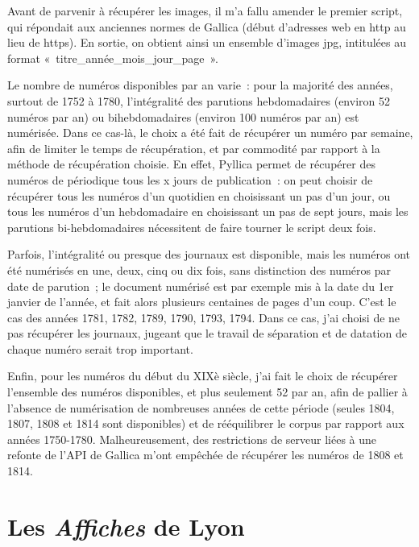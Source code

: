 \bigskip

Avant de parvenir à récupérer les images, il m’a fallu amender le premier script, qui répondait aux anciennes normes de Gallica (début d’adresses web en http au lieu de https). En sortie, on obtient ainsi un ensemble d’images jpg, intitulées au format « titre\_année\_mois\_jour\_page ».

Le nombre de numéros disponibles par an varie : pour la majorité des années, surtout de 1752 à 1780, l’intégralité des parutions hebdomadaires (environ 52 numéros par an) ou bihebdomadaires (environ 100 numéros par an) est numérisée. Dans ce cas-là, le choix a été fait de récupérer un numéro par semaine, afin de limiter le temps de récupération, et par commodité par rapport à la méthode de récupération choisie. En effet, Pyllica permet de récupérer des numéros de périodique tous les x jours de publication : on peut choisir de récupérer tous les numéros d’un quotidien en choisissant un pas d’un jour, ou tous les numéros d’un hebdomadaire en choisissant un pas de sept jours, mais les parutions bi-hebdomadaires nécessitent de faire tourner le script deux fois. 

Parfois, l’intégralité ou presque des journaux est disponible, mais les numéros ont été numérisés en une, deux, cinq ou dix fois, sans distinction des numéros par date de parution ; le document numérisé est par exemple mis à la date du 1er janvier de l’année, et fait alors plusieurs centaines de pages d’un coup. C’est le cas des années 1781, 1782, 1789, 1790, 1793, 1794. Dans ce cas, j’ai choisi de ne pas récupérer les journaux, jugeant que le travail de séparation et de datation de chaque numéro serait trop important.

Enfin, pour les numéros du début du XIXè siècle, j’ai fait le choix de récupérer l’ensemble des numéros disponibles, et plus seulement 52 par an, afin de pallier à l’absence de numérisation de nombreuses années de cette période (seules 1804, 1807, 1808 et 1814 sont disponibles) et de rééquilibrer le corpus par rapport aux années 1750-1780. Malheureusement, des restrictions de serveur liées à une refonte de l’API de Gallica m’ont empêchée de récupérer les numéros de 1808 et 1814. 



\section{Les \textit{Affiches} de Lyon}

